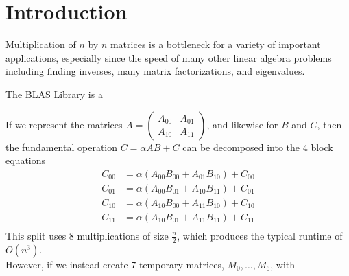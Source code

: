 \documentclass{article}         %
\begin{document}
\section*{Introduction}
Multiplication of $n$ by $n$ matrices is a bottleneck for a variety of important applications, especially since the speed of many other linear algebra problems including finding inverses, many matrix factorizations, and eigenvalues.

The BLAS Library is a 

If we represent the matrices $A=\begin{pmatrix}
A_{00}&A_{01}\\A_{10}&A_{11}
\end{pmatrix}$, and likewise for $B$ and $C$, then the fundamental operation $C = \alpha AB+C$ can be decomposed into the 4 block equations 
\begin{equation}
\begin{split}
C_{00}&=\alpha(A_{00}B_{00}+A_{01}B_{10})+C_{00}\\
C_{01}&=\alpha(A_{00}B_{01}+A_{10}B_{11})+C_{01}\\
C_{10}&=\alpha(A_{10}B_{00}+A_{11}B_{10})+C_{10}\\
C_{11}&=\alpha(A_{10}B_{01}+A_{11}B_{11})+C_{11}\\
\end{split}
\end{equation}
This split uses 8 multiplications of size $\frac n2$, which produces the typical runtime of $O(n^3)$.\\ However, if we instead create 7 temporary matrices, $M_0,\dots, M_6$, with
\end{document}
